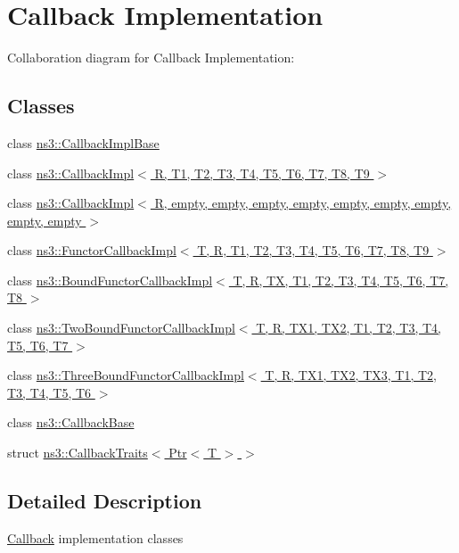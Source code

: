 \hypertarget{group__callbackimpl}{}\section{Callback Implementation}
\label{group__callbackimpl}
Collaboration diagram for Callback Implementation\+:
\subsection*{Classes}
\begin{DoxyCompactItemize}
\item 
class \hyperlink{classns3_1_1CallbackImplBase}{ns3\+::\+Callback\+Impl\+Base}
\item 
class \hyperlink{classns3_1_1CallbackImpl}{ns3\+::\+Callback\+Impl$<$ R, T1, T2, T3, T4, T5, T6, T7, T8, T9 $>$}
\item 
class \hyperlink{classns3_1_1CallbackImpl_3_01R_00_01empty_00_01empty_00_01empty_00_01empty_00_01empty_00_01empty95b014f95428197cb51aac9872e394ba}{ns3\+::\+Callback\+Impl$<$ R, empty, empty, empty, empty, empty, empty, empty, empty, empty $>$}
\item 
class \hyperlink{classns3_1_1FunctorCallbackImpl}{ns3\+::\+Functor\+Callback\+Impl$<$ T, R, T1, T2, T3, T4, T5, T6, T7, T8, T9 $>$}
\item 
class \hyperlink{classns3_1_1BoundFunctorCallbackImpl}{ns3\+::\+Bound\+Functor\+Callback\+Impl$<$ T, R, T\+X, T1, T2, T3, T4, T5, T6, T7, T8 $>$}
\item 
class \hyperlink{classns3_1_1TwoBoundFunctorCallbackImpl}{ns3\+::\+Two\+Bound\+Functor\+Callback\+Impl$<$ T, R, T\+X1, T\+X2, T1, T2, T3, T4, T5, T6, T7 $>$}
\item 
class \hyperlink{classns3_1_1ThreeBoundFunctorCallbackImpl}{ns3\+::\+Three\+Bound\+Functor\+Callback\+Impl$<$ T, R, T\+X1, T\+X2, T\+X3, T1, T2, T3, T4, T5, T6 $>$}
\item 
class \hyperlink{classns3_1_1CallbackBase}{ns3\+::\+Callback\+Base}
\item 
struct \hyperlink{structns3_1_1CallbackTraits_3_01Ptr_3_01T_01_4_01_4}{ns3\+::\+Callback\+Traits$<$ Ptr$<$ T $>$ $>$}
\end{DoxyCompactItemize}


\subsection{Detailed Description}
\hyperlink{classns3_1_1Callback}{Callback} implementation classes 
